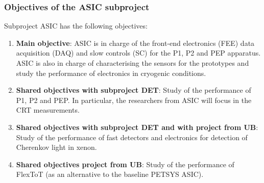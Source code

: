 \subsubsection*{Objectives of the ASIC subproject}
Subproject ASIC has the following objectives:
\begin{enumerate}
\item {\bf Main objective}: ASIC is in charge of the front-end electronics (FEE) data acquisition (DAQ) and slow controls (SC) for the P1, P2 and PEP apparatus. ASIC is also in charge of characterising the sensors for the prototypes and study the performance of electronics in cryogenic conditions. 
\item {\bf Shared objectives with subproject DET}: Study of the performance of P1, P2 and PEP. In particular, the researchers from ASIC will focus in the CRT measurements. 
\item {\bf Shared objectives with subproject DET and with project from UB}: Study of the performance of fast detectors and electronics for detection of Cherenkov light in xenon.
\item {\bf Shared objectives project from UB}: Study of the performance of FlexToT (as an alternative to the baseline PETSYS ASIC). 
\end{enumerate}

